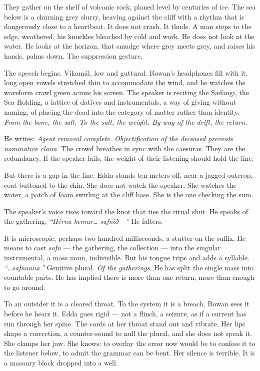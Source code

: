 \documentclass[11pt,oneside]{book}
\begin{document}
They gather on the shelf of volcanic rock, planed level by centuries of
ice. The sea below is a churning grey slurry, heaving against the cliff
with a rhythm that is dangerously close to a heartbeat. It does not
crash. It thuds. A man steps to the edge, weathered, his knuckles
bleached by cold and work. He does not look at the water. He looks at
the horizon, that smudge where grey meets grey, and raises his hands,
palms down. The suppression gesture.

The speech begins. Vikamál, low and guttural. Rowan's headphones fill
with it, long open vowels stretched thin to accommodate the wind, and he
watches the waveform crawl green across his screen. The speaker is
reciting the Sæfangi, the Sea-Holding, a lattice of datives and
instrumentals, a way of giving without naming, of placing the dead into
the category of matter rather than identity. \emph{From the bone, the
salt. To the salt, the weight. By way of the drift, the return.}

He writes: \emph{Agent removal complete. Objectification of the deceased
prevents nominative claim.} The crowd breathes in sync with the
caesuras. They are the redundancy. If the speaker fails, the weight of
their listening should hold the line.

But there is a gap in the line. Edda stands ten meters off, near a
jagged outcrop, coat buttoned to the chin. She does not watch the
speaker. She watches the water, a patch of foam swirling at the cliff
base. She is the one checking the sum.

The speaker's voice rises toward the knot that ties the ritual shut. He
speaks of the gathering. \emph{``Hérna kemur\ldots{} safnið---''} He
falters.

It is microscopic, perhaps two hundred milliseconds, a stutter on the
suffix. He means to cast \emph{safn} --- the gathering, the collection
--- into the singular instrumental, a mass noun, indivisible. But his
tongue trips and adds a syllable. \emph{``\ldots safnanna.''} Genitive
plural. \emph{Of the gatherings.} He has split the single mass into
countable parts. He has implied there is more than one return, more than
enough to go around.

To an outsider it is a cleared throat. To the system it is a breach.
Rowan sees it before he hears it. Edda goes rigid --- not a flinch, a
seizure, as if a current has run through her spine. The cords at her
throat stand out and vibrate. Her lips shape a correction, a
counter-sound to null the plural, and she does not speak it. She clamps
her jaw. She knows: to overlay the error now would be to confess it to
the listener below, to admit the grammar can be bent. Her silence is
terrible. It is a masonry block dropped into a well.
\end{document}
